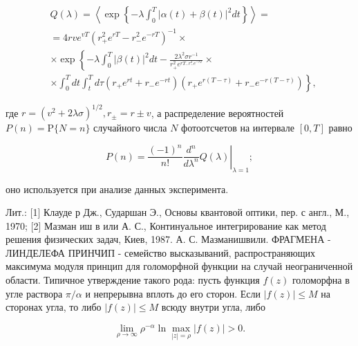 \documentclass[10pt]{article}
\begin{document}
\[

\begin{aligned}

& Q(\lambda)=\left\langle\exp \left\{-\lambda \int_{0}^{T}|\alpha(t)+\beta(t)|^{2} d t\right\}\right\rangle= \\

& =4 r v e^{v T}\left(r_{+}^{2} e^{r T}-r_{-}^{2} e^{-r T}\right)^{-1} \times \\

& \times \exp \left\{-\lambda \int_{0}^{T}|\beta(t)|^{2} d t-\frac{2 \lambda^{2} \sigma r^{-1}}{r_{+}^{2} e^{r T_{-} r_{-}^{2} e^{-r T}}} \times\right. \\

& \left.\times \int_{0}^{T} d t \int_{t}^{T} d \tau\left(r_{+} e^{r t}+r_{-} e^{-r t}\right)\left(r_{+} e^{r(T-\tau)}+r_{-} e^{-r(T-\tau)}\right)\right\},

\end{aligned}

\]



где $r=\left(v^{2}+2 \lambda \sigma\right)^{1 / 2}, r_{ \pm}=r \pm v$, а распределение вероятностей $P(n)=\mathrm{P}\{N=n\}$ случайного числа $N$ фотоотсчетов на интервале $[0, T]$ равно



\[

P(n)=\left.\frac{(-1)^{n}}{n !} \frac{d^{n}}{d \lambda^{n}} Q(\lambda)\right|_{\lambda=1} ;

\]



оно используется при анализе данных эксперимента.



Лит.: [1] Клауде р Дж., Сударшан Э., Основы квантовой оптики, пер. с англ., М., 1970; [2] Мазман иш в или А. С., Континуальное интегрирование как метод решения физических задач, Киев, 1987. А. С. Мазманишвили. ФРАГМЕНА - ЛИНДЕЛЕФА ПРИНЧИП - семейство высказываний, распространяющих максимума модуля принцип для голоморфной функции на случай неограниченной области. Типичное утверждение такого рода: пусть функция $f(z)$ голоморфна в угле раствора $\pi / \alpha$ и непрерывна вплоть до его сторон. Если $|f(z)| \leqslant M$ на сторонах угла, то либо $|f(z)| \leqslant M$ всюду внутри угла, либо



\[

\lim _{\rho \rightarrow \infty} \rho^{-\alpha} \ln \max _{|z|=\rho}|f(z)|>0 .

\]
\end{document}
